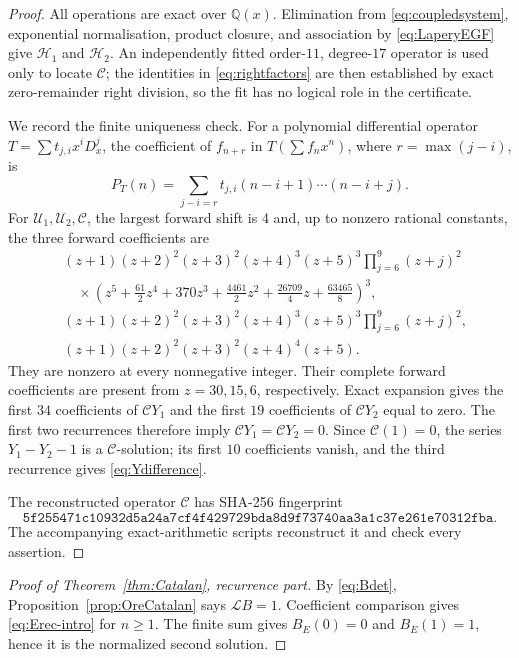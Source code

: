 \documentclass[11pt]{article}
\theoremstyle{definition}
\theoremstyle{remark}
\newcommand{\Q}{\mathbb Q}
\begin{document}
\begin{proof}
All operations are exact over $\Q(x)$.  Elimination from
\eqref{eq:coupledsystem}, exponential normalisation, product closure, and association by
\eqref{eq:LaperyEGF} give $\mathcal H_1$ and $\mathcal H_2$.  An independently fitted
order-$11$, degree-$17$ operator is used only to locate $\mathcal C$; the identities in
\eqref{eq:rightfactors} are then established by exact zero-remainder right division, so
the fit has no logical role in the certificate.

We record the finite uniqueness check.  For a polynomial differential operator
$T=\sum t_{j,i}x^iD_x^j$, the coefficient of $f_{n+r}$ in $T(\sum f_nx^n)$, where
$r=\max(j-i)$, is
\begin{equation}\label{eq:forwardcoeff}
 P_T(n)=\sum_{j-i=r}t_{j,i}(n-i+1)\cdots(n-i+j).
\end{equation}
For $\mathcal U_1,\mathcal U_2,\mathcal C$, the largest forward shift is $4$ and, up to
nonzero rational constants, the three forward coefficients are
\begin{align*}
 &(z+1)(z+2)^2(z+3)^2(z+4)^3(z+5)^3\prod_{j=6}^{9}(z+j)^2\\[-1mm]
 &\quad\times
 \left(z^5+\frac{61}{2}z^4+370z^3+\frac{4461}{2}z^2
             +\frac{26709}{4}z+\frac{63465}{8}\right)^3,\\
 &(z+1)(z+2)^2(z+3)^2(z+4)^3(z+5)^3\prod_{j=6}^{9}(z+j)^2,\\
 &(z+1)(z+2)^2(z+3)^2(z+4)^4(z+5).
\end{align*}
They are nonzero at every nonnegative integer.  Their complete forward coefficients are
present from $z=30,15,6$, respectively.  Exact expansion gives the first $34$
coefficients of $\mathcal CY_1$ and the first $19$ coefficients of $\mathcal CY_2$ equal
to zero.  The first two recurrences therefore imply
$\mathcal CY_1=\mathcal CY_2=0$.  Since $\mathcal C(1)=0$, the series $Y_1-Y_2-1$ is a
$\mathcal C$-solution; its first $10$ coefficients vanish, and the third recurrence gives
\eqref{eq:Ydifference}.

The reconstructed operator $\mathcal C$ has SHA-256 fingerprint
\[
 \texttt{5f255471c10932d5a24a7cf4f429729bda8d9f73740aa3a1c37e261e70312fba}.
\]
The accompanying exact-arithmetic scripts reconstruct it and check every assertion.
\end{proof}

\begin{proof}[Proof of Theorem~\ref{thm:Catalan}, recurrence part]
By \eqref{eq:Bdet}, Proposition~\ref{prop:OreCatalan} says $\mathcal LB=1$.
Coefficient comparison gives \eqref{eq:Erec-intro} for $n\ge1$.  The finite sum gives
$B_E(0)=0$ and $B_E(1)=1$, hence it is the normalized second solution.
\end{proof}
\end{document}
